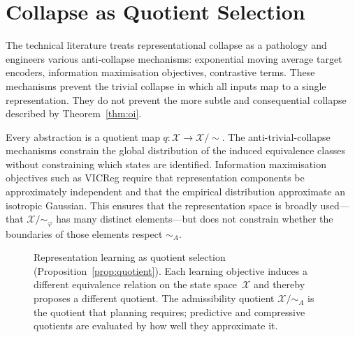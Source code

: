 \documentclass[11pt, a4paper]{article}
\theoremstyle{plain}
\theoremstyle{definition}
\theoremstyle{remark}
\newcommand{\simA}{\sim_A}
\newcommand{\simO}{\sim_O}
\newcommand{\simC}{\sim_C}
\begin{document}
\section{Collapse as Quotient Selection}

The technical literature treats representational collapse as a pathology and
engineers various anti-collapse mechanisms: exponential moving average target
encoders, information maximisation objectives, contrastive terms. These mechanisms
prevent the trivial collapse in which all inputs map to a single representation.
They do not prevent the more subtle and consequential collapse described by
Theorem~\ref{thm:oi}.

Every abstraction is a quotient map $q : \mathcal{X} \to \mathcal{X}/{\sim}$.
The anti-trivial-collapse mechanisms constrain the global distribution of the
induced equivalence classes without constraining which states are identified.
Information maximisation objectives such as VICReg require that representation
components be approximately independent and that the empirical distribution
approximate an isotropic Gaussian. This ensures that the representation space
is broadly used---that $\mathcal{X}/{\sim_\varphi}$ has many distinct
elements---but does not constrain whether the boundaries of those elements
respect $\simA$.


\begin{figure}[t]
\centering
{}
\caption{Representation learning as quotient selection
(Proposition~\ref{prop:quotient}). Each learning objective induces a
different equivalence relation on the state space~$\mathcal{X}$ and thereby
proposes a different quotient. The admissibility quotient
$\mathcal{X}/{\simA}$ is the quotient that planning requires; predictive
and compressive quotients are evaluated by how well they approximate it.}
\label{fig:quotients}
\end{figure}
\end{document}

